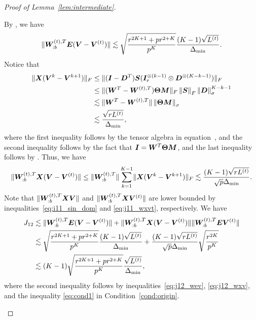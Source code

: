 \documentclass[lettersize,onecolumn,journal]{IEEEtran}
\theoremstyle{definition}
\theoremstyle{definition}
\begin{document}
\begin{proof}[Proof of Lemma~\ref{lem:intermediate}]
\begin{enumerate}
    By \citet[Proof of Lemma 5]{han2020exact}, we have 
    \begin{equation}\label{eq:j12_wev}
        \onormSize{}{\mW_{:b}^{(t),T} \mE (\mV-\mV^{(t)})} \lesssim \sqrt{ \frac{r^{2K+1} + p r^{2 + K}}{p^K} } \frac{(K-1)\sqrt{L^{(t)}}}{\Delta_{\min}}.
    \end{equation}
    Notice that 
    \begin{align}
        \lVert\bm X (\bm{V}^k-\bm{V}^{k+1})\rVert_F &\leq \lVert(\bm I - \bm{D}^T) \bm S (\bm I_r^{\otimes (k-1)} \otimes  \bm{D}^{\otimes (K-k-1)})\rVert_F \\
        &\leq \lVert(\bm{W}^T - \bm{W}^{(t),T}) \boldsymbol{\Theta} \bm M\rVert_F \left\lVert\bm S\right\rVert_F \left\lVert \bm{D}\right\rVert_{\sigma}^{K-k-1}\\
        & \lesssim \lVert \bm{W}^T - \bm{W}^{(t),T} \rVert \left\lVert\boldsymbol{\Theta} \bm M\right\rVert_{\sigma} \\
        & \lesssim \frac{ \sqrt{r L^{(t)}}}{\Delta_{\min}},
    \end{align}
    where the first inequality follows by the tensor algebra in equation~\label{eq:j11_inner}, and the second inequality follows by the fact  that $\bm I = \bm{W}^T \boldsymbol{\Theta} \bm M$, and the last inequality follows by \citet[Proof of Lemma 5]{han2020exact}. Thus, we have
    \begin{equation}
           \onormSize{}{\mW_{:b}^{(t),T} \mX (\mV-\mV^{(t)})}\leq \onormSize{}{\mW_{:b}^{(t),T} }  \sum_{k = 1}^{K-1} \onormSize{}{\mX (\mV^k-\mV^{k+1})}_F \lesssim \frac{ (K-1) \sqrt{r L^{(t)}}}{\sqrt{p} \Delta_{\min}}.\label{eq:j12_wxv}
    \end{equation}
    Note that $\lVert\bm{W}_{:b}^{(t),T} \bm X \bm{V} \rVert$ and $\lVert\bm{W}_{:b}^{(t),T} \bm X \bm{V}^{(t)} \rVert$ are lower bounded by inequalities~\eqref{eq:i11_sin_dom} and \eqref{eq:j11_wxvt}, respectively. We have 
    \begin{align}
        J_{12} &\lesssim \lVert\bm{W}_{:b}^{(t),T} \bm{E} (\bm{V}-\bm{V}^{(t)})\rVert + \lVert\bm{W}_{:b}^{(t),T} \bm X (\bm{V}-\bm{V}^{(t)})\rVert\lVert\bm{W}_{:b}^{(t),T} \bm{E} \bm{V}^{(t)} \rVert\\
        &\lesssim \sqrt{ \frac{r^{2K+1} + p r^{2 + K}}{p^K} } \frac{(K-1)\sqrt{L^{(t)}}}{\Delta_{\min}} + \frac{ (K-1) \sqrt{r L^{(t)}}}{\sqrt{p} \Delta_{\min}} \sqrt{\frac{r^{2K}}{p^K}} \\
        & \lesssim (K-1) \sqrt{ \frac{r^{2K+1} + p r^{2 + K}}{p^K} } \frac{\sqrt{L^{(t)}}}{\Delta_{\min}},
    \end{align}
    where the second inequality follows by inequalities~\eqref{eq:j12_wev}, \eqref{eq:j12_wxv}, and the inequality \eqref{eq:cond1} in Condition~\ref{cond:origin}.
    


\end{enumerate}
\end{proof}
\end{document}
